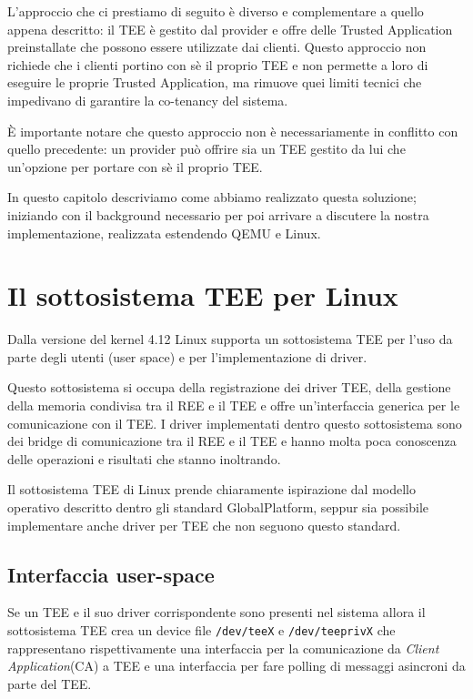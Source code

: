 \documentclass[12pt,italian]{report}
\begin{document}
L'approccio che ci prestiamo di seguito è diverso e complementare a quello
appena descritto: il TEE è gestito dal provider e offre delle Trusted
Application preinstallate che possono essere utilizzate dai clienti.
Questo approccio non richiede che i clienti portino con sè il proprio TEE
e non permette a loro di eseguire le proprie Trusted Application, ma rimuove
quei limiti tecnici che impedivano di garantire la co-tenancy del sistema.

È importante notare che questo approccio non è necessariamente in conflitto
con quello precedente: un provider può offrire sia un TEE gestito da lui
che un'opzione per portare con sè il proprio TEE.

\bigbreak \noindent

In questo capitolo descriviamo come abbiamo realizzato questa soluzione;
iniziando con il background necessario per poi arrivare a discutere la nostra
implementazione, realizzata estendendo QEMU e Linux.

\section{Il sottosistema TEE per Linux}
\label{sec:sottosistema-tee-per-linux}
Dalla versione del kernel 4.12 Linux supporta un sottosistema TEE
\cite{linux_tee_subsystem}
per l'uso da parte degli utenti (user space) e per l'implementazione
di driver.

Questo sottosistema si occupa della registrazione dei driver TEE, della
gestione della memoria condivisa tra il REE e il TEE e offre un'interfaccia
generica per le comunicazione con il TEE.
I driver implementati dentro questo sottosistema sono dei bridge di
comunicazione tra il REE e il TEE e hanno molta poca conoscenza delle
operazioni e risultati che stanno inoltrando.

Il sottosistema TEE di Linux prende chiaramente ispirazione dal modello
operativo descritto dentro gli standard GlobalPlatform, seppur sia possibile
implementare anche driver per TEE che non seguono questo standard.

\subsection{Interfaccia user-space}
\label{subsec:interfaccia-user-space}
Se un TEE e il suo driver corrispondente sono presenti nel sistema allora
il sottosistema TEE crea un device file \texttt{/dev/teeX} e
\texttt{/dev/teeprivX} che rappresentano rispettivamente una interfaccia
per la comunicazione da \textit{Client Application}(CA) a TEE e una
interfaccia per fare polling di messaggi asincroni da parte del TEE.
\end{document}
